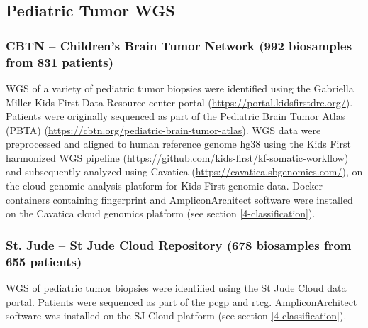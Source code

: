 \subsection{Pediatric Tumor WGS}

\subsubsection{CBTN – Children’s Brain Tumor Network (992 biosamples from 831 patients)} WGS of a variety of pediatric tumor biopsies were identified using the Gabriella Miller Kids First Data Resource center portal (\url{https://portal.kidsfirstdrc.org/}). Patients were originally sequenced as part of the Pediatric Brain Tumor Atlas (PBTA) (\url{https://cbtn.org/pediatric-brain-tumor-atlas}). WGS data were preprocessed and aligned to human reference genome hg38 using the Kids First harmonized WGS pipeline (\url{https://github.com/kids-first/kf-somatic-workflow}) and subsequently analyzed using Cavatica (\url{https://cavatica.sbgenomics.com/}), on the cloud genomic analysis platform for Kids First genomic data. Docker containers containing fingerprint and AmpliconArchitect software were installed on the Cavatica cloud genomics platform (see section \ref{4-classification}).

\subsubsection{St. Jude – St Jude Cloud Repository (678 biosamples from 655 patients)} WGS of pediatric tumor biopsies were identified using the St Jude Cloud data portal. Patients were sequenced as part of the \gls{pcgp} and \gls{rtcg}. AmpliconArchitect software was installed on the SJ Cloud platform (see section \ref{4-classification}). 

